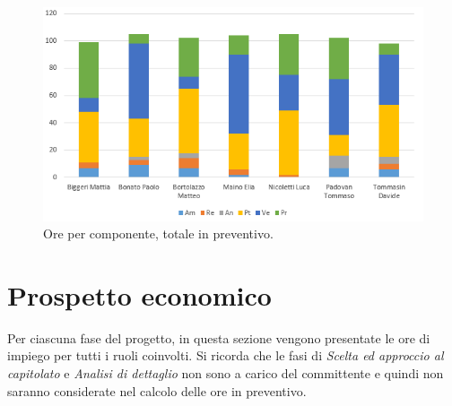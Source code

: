 \documentclass[a4paper]{article}
\begin{document}
				\begin{figure}[H]
					\centering
					\includegraphics[scale=0.9]{bc_rendicontate.png}
					\caption{Ore per componente, totale in preventivo.}
				\end{figure}
				
	\newpage 
	\section{Prospetto economico}
	
		Per ciascuna fase del progetto, in questa sezione vengono presentate le ore di impiego per tutti i 
		ruoli coinvolti. Si ricorda che le fasi di \emph{Scelta ed approccio al capitolato} e \emph{Analisi di dettaglio} non sono 
		a carico del committente e quindi non saranno considerate nel calcolo delle ore in preventivo.
		
\end{document}
